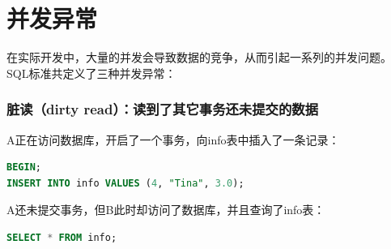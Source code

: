\documentclass[12pt, openany, oneside]{book}
\begin{document}
\begin{table}[H]
	\centering
	\caption{事务控制语句}
\end{table}

\vspace{0.5cm}

\section{并发异常}

在实际开发中，大量的并发会导致数据的竞争，从而引起一系列的并发问题。\\

SQL标准共定义了三种并发异常：

\subsubsection{脏读（dirty read）：读到了其它事务还未提交的数据}

A正在访问数据库，开启了一个事务，向info表中插入了一条记录：

\vspace{-0.5cm}

\begin{lstlisting}[language=SQL]
BEGIN;
INSERT INTO info VALUES (4, "Tina", 3.0);
\end{lstlisting}

A还未提交事务，但B此时却访问了数据库，并且查询了info表：

\vspace{-0.5cm}

\begin{lstlisting}[language=SQL]
SELECT * FROM info;
\end{lstlisting}
\end{document}
